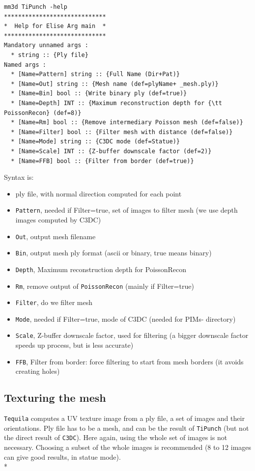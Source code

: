 \begin{verbatim}
mm3d TiPunch -help
*****************************
*  Help for Elise Arg main  *
*****************************
Mandatory unnamed args :
  * string :: {Ply file}
Named args :
  * [Name=Pattern] string :: {Full Name (Dir+Pat)}
  * [Name=Out] string :: {Mesh name (def=plyName+ _mesh.ply)}
  * [Name=Bin] bool :: {Write binary ply (def=true)}
  * [Name=Depth] INT :: {Maximum reconstruction depth for {\tt PoissonRecon} (def=8)}
  * [Name=Rm] bool :: {Remove intermediary Poisson mesh (def=false)}
  * [Name=Filter] bool :: {Filter mesh with distance (def=false)}
  * [Name=Mode] string :: {C3DC mode (def=Statue)}
  * [Name=Scale] INT :: {Z-buffer downscale factor (def=2)}
  * [Name=FFB] bool :: {Filter from border (def=true)}
\end{verbatim}

Syntax is:

\begin{itemize}
  \item ply file, with normal direction computed for each point
  \item {\tt Pattern}, needed if Filter=true, set of images to filter mesh (we use depth images computed by C3DC)
  \item {\tt Out}, output mesh filename
  \item {\tt Bin}, output mesh ply format (ascii or binary, true means binary)
  \item {\tt Depth}, Maximum reconstruction depth for PoissonRecon
  \item {\tt Rm}, remove output of {\tt PoissonRecon} (mainly if Filter=true)
  \item {\tt Filter}, do we filter mesh
  \item {\tt Mode}, needed if Filter=true, mode of C3DC (needed for PIMs- directory)
  \item {\tt Scale}, Z-buffer downscale factor, used for filtering (a bigger downscale factor speeds up process, but is less accurate)
  \item {\tt FFB}, Filter from border: force filtering to start from mesh borders (it avoids creating holes)
\end{itemize}

\subsection{Texturing the mesh}

{\tt Tequila} computes a UV texture image from a ply file, a set of images and their orientations. Ply file has to be a mesh, and can be the result of {\tt TiPunch} (but not the direct result of {\tt C3DC}).
Here again, using the whole set of images is not necessary. Choosing a subset of the whole images is recommended (8 to 12 images can give good results, in statue mode).\\*

